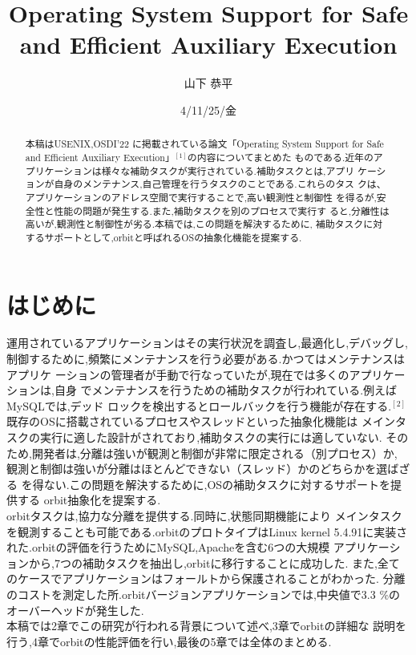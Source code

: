 \documentclass[submit,techreq,noauthor]{eco}	%
\begin{document}
\date   {4/11/25/金}				%
\title  {Operating System Support for Safe and Efficient Auxiliary Execution}	%
\author {山下 恭平}				%

\begin{abstract}
本稿はUSENIX,OSDI'22 に掲載されている論文「Operating System Support
 for Safe and Efficient Auxiliary Execution」\begin{math}^{[1]}\end{math}の内容についてまとめた
ものである.近年のアプリケーションは様々な補助タスクが実行されている.補助タスクとは,アプリ
ケーションが自身のメンテナンス,自己管理を行うタスクのことである.これらのタス
クは、アプリケーションのアドレス空間で実行することで,高い観測性と制御性
を得るが,安全性と性能の問題が発生する.また,補助タスクを別のプロセスで実行す
ると,分離性は高いが,観測性と制御性が劣る.本稿では,この問題を解決するために,
補助タスクに対するサポートとして,orbitと呼ばれるOSの抽象化機能を提案する.

\end{abstract}
\maketitle

\section{はじめに}
運用されているアプリケーションはその実行状況を調査し,最適化し,デバッグし,
制御するために,頻繁にメンテナンスを行う必要がある.かつてはメンテナンスはアプリケ
ーションの管理者が手動で行なっていたが,現在では多くのアプリケーションは,自身
でメンテナンスを行うための補助タスクが行われている.例えばMySQLでは,デッド
ロックを検出するとロールバックを行う機能が存在する.\begin{math}^{[2]}\end{math}
\indent 既存のOSに搭載されているプロセスやスレッドといった抽象化機能は
メインタスクの実行に適した設計がされており,補助タスクの実行には適していない.
そのため,開発者は,分離は強いが観測と制御が非常に限定される（別プロセス）か,
観測と制御は強いが分離はほとんどできない（スレッド）かのどちらかを選ばざる
を得ない.この問題を解決するために,OSの補助タスクに対するサポートを提供する
orbit抽象化を提案する.\\
\indent orbitタスクは,協力な分離を提供する.同時に,状態同期機能により
メインタスクを観測することも可能である.orbitのプロトタイプはLinux kernel 
5.4.91に実装された.orbitの評価を行うためにMySQL,Apacheを含む6つの大規模
アプリケーションから,7つの補助タスクを抽出し,orbitに移行することに成功した.
また,全てのケースでアプリケーションはフォールトから保護されることがわかった.
分離のコストを測定した所.orbitバージョンアプリケーションでは,中央値で3.3
\%のオーバーヘッドが発生した.\\
\indent 本稿では2章でこの研究が行われる背景について述べ,3章でorbitの詳細な
説明を行う,4章でorbitの性能評価を行い,最後の5章では全体のまとめる.
\end{document}
